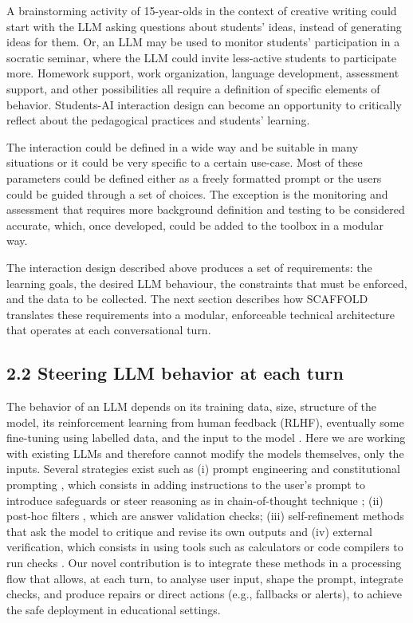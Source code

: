 \documentclass[fleqn,10pt]{wlscirep}
\begin{document}
A brainstorming activity of 15-year-olds in the context of creative writing could start with the LLM asking questions about students' ideas, instead of generating ideas for them. Or, an LLM may be used to monitor students' participation in a socratic seminar, where the LLM could invite less-active students to participate more. Homework support, work organization, language development, assessment support, and other possibilities all require a definition of specific elements of behavior. Students-AI interaction design can become an opportunity to critically reflect about the pedagogical practices and students' learning.

The interaction could be defined in a wide way and be suitable in many situations or it could be very specific to a certain use-case. Most of these parameters could be defined either as a freely formatted prompt or the users could be guided through a set of choices. The exception is the monitoring and assessment that requires more background definition and testing to be considered accurate, which, once developed, could be added to the toolbox in a modular way.

The interaction design described above produces a set of requirements: the learning goals, the desired LLM behaviour, the constraints that must be enforced, and the data to be collected. The next section describes how SCAFFOLD translates these requirements into a modular, enforceable technical architecture that operates at each conversational turn.

\subsection*{2.2 Steering LLM behavior at each turn}

The behavior of an LLM depends on its training data, size, structure of the model, its reinforcement learning from human feedback (RLHF), eventually some fine-tuning using labelled data, and the input to the model \cite{Ouyang2022, Bai2022, Zhao2023}. Here we are working with existing LLMs and therefore cannot modify the models themselves, only the inputs. Several strategies exist such as (i) prompt engineering and constitutional prompting \cite{Bai2022}, which consists in adding instructions to the user's prompt to introduce safeguards or steer reasoning as in chain-of-thought technique \cite{Wei2023}; (ii) post-hoc filters \cite{Rebedea2023}, which are answer validation checks; (iii) self-refinement methods that ask the model to critique and revise its own outputs \cite{Shinn2023, Gou2024} and (iv) external verification, which consists in using tools such as calculators or code compilers to run checks \cite{Madaan2023, Pan2023, Qiu2024}. Our novel contribution is to integrate these methods in a processing flow that allows, at each turn, to analyse user input, shape the prompt, integrate checks, and produce repairs or direct actions (e.g., fallbacks or alerts), to achieve the safe deployment in educational settings.
\end{document}
